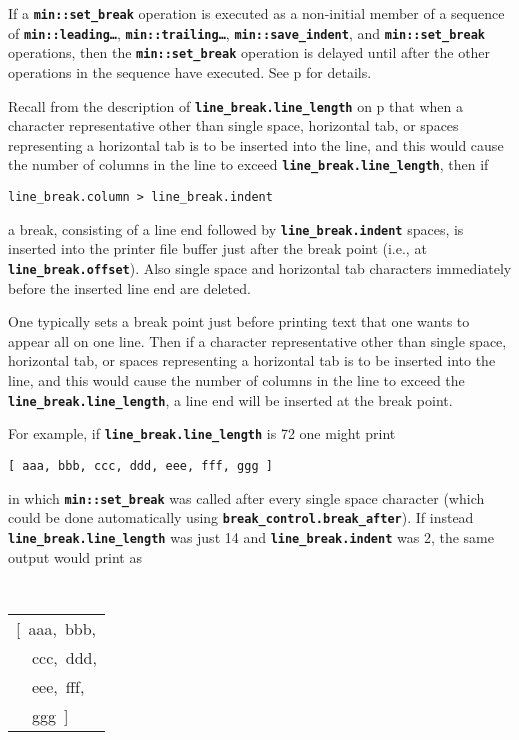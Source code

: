 \documentclass[12pt]{article}
\newcommand{\TT}[1]{{\tt \bfseries #1}}
\newcommand{\pagref}[1]{p\pageref{#1}}
\newcommand{\EOL}{\penalty \exhyphenpenalty}
\begin{document}
If a \TT{min::set\_break} operation is executed as a non-initial
member of a sequence of
\TT{min::\EOL leading\ldots},
\TT{min::\EOL trailing\ldots},
\TT{min::\EOL save\_\EOL indent},
and \TT{min::\EOL set\_\EOL break} operations, then the
\TT{min::\EOL set\_\EOL break} operation is delayed until
after the other operations in the sequence have executed.  See
\pagref{LEADING-TRAILING-SET-BREAK} for details.

Recall from the description of \TT{line\_\EOL break.line\_\EOL length} on
\pagref{LINE-LENGTH}
that when a character representative other than single space, horizontal
tab, or spaces representing a horizontal tab
is to be inserted into the line, and this would cause the number
of columns in the line to exceed \TT{line\_\EOL break.line\_\EOL length},
then if
\begin{center}
\tt line\_break.column > line\_break.indent
\end{center}
a break, consisting of a line end followed by \TT{line\_\EOL break.indent}
spaces,
is inserted into the printer file buffer just after the break point
(i.e., at \TT{line\_\EOL break.offset}).  Also
single space and horizontal tab
characters immediately before the inserted line end are deleted.

One typically sets a break point just before printing text that one wants
to appear all on one line.  Then if
a character representative other than single space, horizontal
tab, or spaces representing a horizontal tab
is to be inserted into the line, and this would cause the number
of columns in the line to exceed the \TT{line\_\EOL break.line\_\EOL length},
a line end will be inserted at the break point.

For example, if \TT{line\_\EOL break.line\_\EOL length} is 72 one might
print
\begin{center}
\tt [ aaa, bbb, ccc, ddd, eee, fff, ggg ]
\end{center}
in which \TT{min::\EOL set\_\EOL break} was called after every single space
character (which could be done automatically using
\TT{break\_\EOL control.break\_\EOL after}).
If instead \TT{line\_\EOL break.line\_\EOL length}
was just 14 and \TT{line\_\EOL break.indent} was 2,
the same output would
print as
\begin{center}
\tt
\begin{tabular}{l}
[~aaa,~bbb, \\
~~ccc,~ddd, \\
~~eee,~fff, \\
~~ggg~] \\
\end{tabular}
\end{center}
\end{document}
